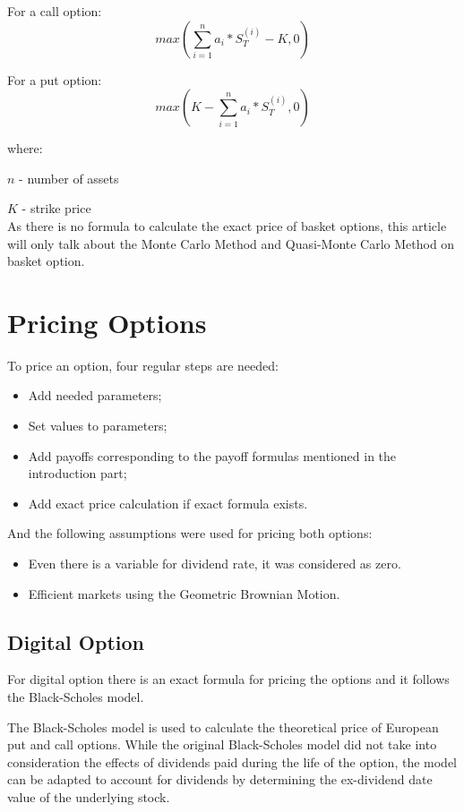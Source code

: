 \documentclass[]{elsarticle}
\theoremstyle{definition}
\theoremstyle{remark}
\begin{document}
For a call option:
\[max(\sum_{i=1}^n {a_i*S_T^{(i)}} - K, 0)\]

For a put option:
 \[max(K - \sum_{i=1}^n {a_i*S_T^{(i)}}, 0)\]
 
 where:
 
 \(n\) - number of assets
 
 \(K\) - strike price\\
 
 
As there is no formula to calculate the exact price of basket options, this article will only talk about the Monte Carlo Method and Quasi-Monte Carlo Method on basket option.

\section{Pricing Options}

To price an option, four regular steps are needed:
\begin{itemize}
\item Add needed parameters;
\item Set values to parameters;
\item Add payoffs corresponding to the payoff formulas mentioned in the introduction part;
\item Add exact price calculation if exact formula exists.
\end{itemize}

\hfill

And the following assumptions were used for pricing both options:
\begin{itemize}
\item Even there is a variable for dividend rate, it was considered as zero.
\item Efficient markets using the Geometric Brownian Motion.
\end{itemize}

\subsection{Digital Option}

For digital option there is an exact formula for pricing the options and it follows the Black-Scholes model.

The Black-Scholes model is used to calculate the theoretical price of European put and call options. While the original Black-Scholes model did not take into consideration the effects of dividends paid during the life of the option, the model can be adapted to account for dividends by determining the ex-dividend date value of the underlying stock.
\end{document}
